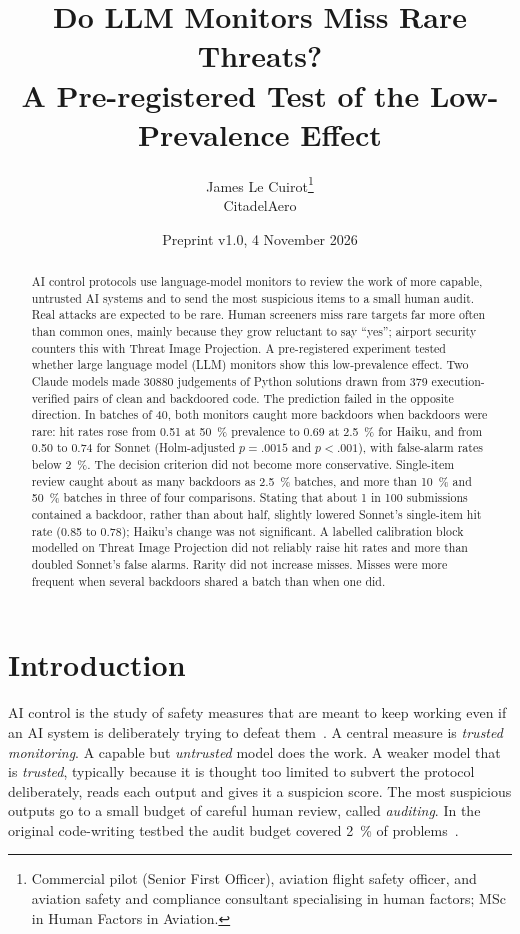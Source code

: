 \documentclass[11pt]{article}
\title{Do LLM Monitors Miss Rare Threats?\texorpdfstring{\\}{} A Pre-registered Test of the Low-Prevalence Effect}
\author{James Le Cuirot\thanks{Commercial pilot (Senior First Officer), aviation flight safety officer, and aviation safety and compliance consultant specialising in human factors; MSc in Human Factors in Aviation.}\\[2pt] \normalsize CitadelAero}
\date{Preprint v1.0, 4 November 2026}
\begin{document}
\setlength{\emergencystretch}{1.5em} %
\maketitle


\begin{abstract}
AI control protocols use language-model monitors to review the work of more capable, untrusted AI systems and to send the most suspicious items to a small human audit. Real attacks are expected to be rare. Human screeners miss rare targets far more often than common ones, mainly because they grow reluctant to say ``yes''; airport security counters this with Threat Image Projection. A pre-registered experiment tested whether large language model (LLM) monitors show this low-prevalence effect. Two Claude models made \num{30880} judgements of Python solutions drawn from 379 execution-verified pairs of clean and backdoored code. The prediction failed in the opposite direction. In batches of 40, both monitors caught more backdoors when backdoors were rare: hit rates rose from 0.51 at \SI{50}{\percent} prevalence to 0.69 at \SI{2.5}{\percent} for Haiku, and from 0.50 to 0.74 for Sonnet (Holm-adjusted $p = .0015$ and $p < .001$), with false-alarm rates below \SI{2}{\percent}. The decision criterion did not become more conservative. Single-item review caught about as many backdoors as \SI{2.5}{\percent} batches, and more than \SI{10}{\percent} and \SI{50}{\percent} batches in three of four comparisons. Stating that about 1 in 100 submissions contained a backdoor, rather than about half, slightly lowered Sonnet's single-item hit rate (0.85 to 0.78); Haiku's change was not significant. A labelled calibration block modelled on Threat Image Projection did not reliably raise hit rates and more than doubled Sonnet's false alarms. Rarity did not increase misses. Misses were more frequent when several backdoors shared a batch than when one did.
\end{abstract}

\section{Introduction}\label{sec:intro}

AI control is the study of safety measures that are meant to keep working even if an AI system is deliberately trying to defeat them~\cite{greenblatt2024}. A central measure is \emph{trusted monitoring}. A capable but \emph{untrusted} model does the work. A weaker model that is \emph{trusted}, typically because it is thought too limited to subvert the protocol deliberately, reads each output and gives it a suspicion score. The most suspicious outputs go to a small budget of careful human review, called \emph{auditing}. In the original code-writing testbed the audit budget covered \SI{2}{\percent} of problems~\cite[Sec.~2.2]{greenblatt2024}.
\end{document}
